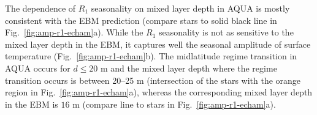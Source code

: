\documentclass{ametsocV5}
\begin{document}
  
  The dependence of $R_1$ seasonality on mixed layer depth in AQUA is mostly consistent with the EBM prediction (compare stars to solid black line in Fig.~\ref{fig:amp-r1-echam}a). While the $R_1$ seasonality is not as sensitive to the mixed layer depth in the EBM, it captures well the seasonal amplitude of surface temperature (Fig.~\ref{fig:amp-r1-echam}b). The midlatitude regime transition in AQUA occurs for $d \le 20$ m and the mixed layer depth where the regime transition occurs is between 20--25 m (intersection of the stars with the orange region in Fig.~\ref{fig:amp-r1-echam}a), whereas the corresponding mixed layer depth in the EBM is $16$ m (compare line to stars in Fig.~\ref{fig:amp-r1-echam}a).%
\end{document}
